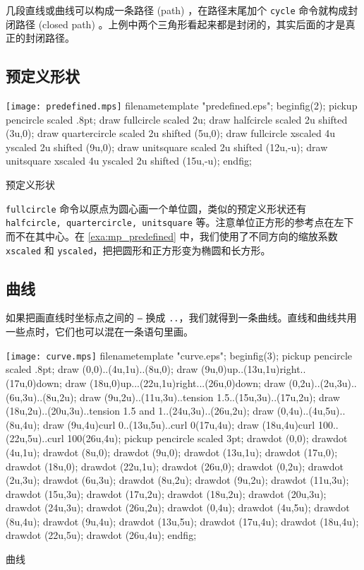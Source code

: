 几段直线或曲线可以构成一条路径 (path) ，在路径末尾加个 \texttt{cycle} 命令就构成封闭路径 (closed path) 。上例中两个三角形看起来都是封闭的，其实后面的才是真正的封闭路径。

\subsection{预定义形状}

\begin{example}[htbp]
\begin{FBTDemo}[numbers=left]{\texttt{[image: predefined.mps]}}
filenametemplate "predefined.eps";
beginfig(2);
pickup pencircle scaled .8pt;
draw fullcircle scaled 2u;
draw halfcircle scaled 2u shifted (3u,0);
draw quartercircle scaled 2u shifted (5u,0);
draw fullcircle xscaled 4u yscaled 2u shifted (9u,0);
draw unitsquare scaled 2u shifted (12u,-u);
draw unitsquare xscaled 4u yscaled 2u shifted (15u,-u);
endfig;
\end{FBTDemo}
\caption{\MP 预定义形状}
\label{exa:mp_predefined}
\end{example}

\texttt{fullcircle} 命令以原点为圆心画一个单位圆，类似的预定义形状还有 \texttt{halfcircle, quartercircle, unitsquare} 等。注意单位正方形的参考点在左下而不在其中心。在 \autoref{exa:mp_predefined} 中，我们使用了不同方向的缩放系数 \texttt{xscaled} 和 \texttt{yscaled}，把把圆形和正方形变为椭圆和长方形。

\subsection{曲线}

如果把画直线时坐标点之间的 \texttt{--} 换成 \texttt{..}，我们就得到一条曲线。直线和曲线共用一些点时，它们也可以混在一条语句里画。

\begin{example}[htbp]
\begin{FBTDemo}[numbers=left]{\texttt{[image: curve.mps]}}
filenametemplate "curve.eps";
beginfig(3);
pickup pencircle scaled .8pt;
draw (0,0)..(4u,1u)..(8u,0);
draw (9u,0){up}..(13u,1u){right}..(17u,0){down};
draw (18u,0){up}...(22u,1u){right}...(26u,0){down};
draw (0,2u)..(2u,3u)..(6u,3u)..(8u,2u);
draw (9u,2u)..(11u,3u)..tension 1.5..(15u,3u)..(17u,2u);
draw (18u,2u)..(20u,3u)..tension 1.5 
  and 1..(24u,3u)..(26u,2u);
draw (0,4u)..(4u,5u)..(8u,4u);
draw (9u,4u){curl 0}..(13u,5u)..{curl 0}(17u,4u);
draw (18u,4u){curl 100}..(22u,5u)..{curl 100}(26u,4u);
pickup pencircle scaled 3pt;
drawdot (0,0); drawdot (4u,1u); drawdot (8u,0);
drawdot (9u,0); drawdot (13u,1u); drawdot (17u,0);
drawdot (18u,0); drawdot (22u,1u); drawdot (26u,0);
drawdot (0,2u); drawdot (2u,3u); drawdot (6u,3u); 
  drawdot (8u,2u);
drawdot (9u,2u); drawdot (11u,3u); drawdot (15u,3u); 
  drawdot (17u,2u);
drawdot (18u,2u); drawdot (20u,3u); drawdot (24u,3u); 
  drawdot (26u,2u);
drawdot (0,4u); drawdot (4u,5u); drawdot (8u,4u);
drawdot (9u,4u); drawdot (13u,5u); drawdot (17u,4u);
drawdot (18u,4u); drawdot (22u,5u); drawdot (26u,4u);
endfig;
\end{FBTDemo}
\caption{\MP 曲线}
\label{exa:mp_curve}
\end{example}

